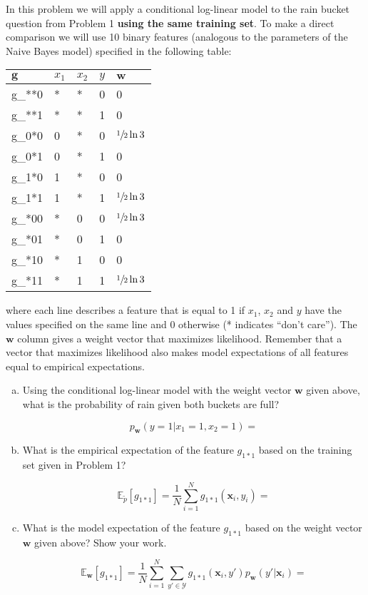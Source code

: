 \documentclass[a4paper,fleqn]{article}
\renewcommand{\vec}{\mathbf}
\begin{document}
In this problem we will apply a conditional log-linear model to the
rain bucket question from Problem 1 {\bf using the same training set}.
To make a direct comparison we will use 10 binary features (analogous
to the parameters of the Naive Bayes model) specified in the following
table:

\begin{center}
\begin{tabular}{lllll}
$\vec{g}$ & $x_1$ & $x_2$ & $y$ & $\vec{w}$ \\ \hline
g_{**0} & * & * & 0 & 0\\
g_{**1} & * & * & 1 & 0\\
g_{0*0} & 0 & * & 0 & $\sfrac{1}{2}\ln 3$\\
g_{0*1} & 0 & * & 1 & 0\\
g_{1*0} & 1 & * & 0 & 0\\
g_{1*1} & 1 & * & 1 & $\sfrac{1}{2}\ln 3$\\
g_{*00} & * & 0 & 0 & $\sfrac{1}{2}\ln 3$\\
g_{*01} & * & 0 & 1 & 0\\
g_{*10} & * & 1 & 0 & 0\\
g_{*11} & * & 1 & 1 & $\sfrac{1}{2}\ln 3$\\
\end{tabular}
\end{center}

where each line describes a feature that is equal to 1 if $x_1$, $x_2$
and $y$ have the values specified on the same line and 0 otherwise (*
indicates ``don't care'').  The $\vec{w}$ column gives a weight vector
that maximizes likelihood.  Remember that a vector that maximizes
likelihood also makes model expectations of all features equal to
empirical expectations.

\begin{enumerate}[(a)]
\item Using the conditional log-linear model with the weight vector
  $\vec{w}$ given above, what is the probability of rain given both
  buckets are full?

\[ p_\vec{w}(y=1 | x_1=1, x_2=1)= \]


\item What is the empirical expectation of the feature $g_{1*1}$
based on the training set given in Problem 1?

\[\mathbb{E}_{\tilde{p}} [g_{1*1}] = 
\frac{1}{N} \sum_{i=1}^N g_{1*1}(\vec{x}_i, y_i)=
\]
\item What is the model expectation of the feature $g_{1*1}$ based on
  the weight vector $\vec{w}$ given above?  Show your work.

\[\mathbb{E}_{\vec{w}} [g_{1*1}] =
\frac{1}{N} \sum_{i=1}^N \sum_{y'\in\mathcal{Y}}
g_{1*1}(\vec{x}_i, y') p_\vec{w}(y'|\vec{x}_i) =
\]
\vspace*{4cm}

\end{enumerate}
\end{document}
